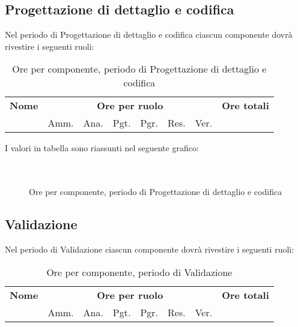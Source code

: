 \pagebreak
\subsection{Progettazione di dettaglio e codifica}

Nel periodo di Progettazione di dettaglio e codifica ciascun componente dovrà rivestire i seguenti ruoli:

\begin{table}[H]
\centering
\begin{tabular}{lccccccc}
\toprule 
    \textbf{Nome}  & \multicolumn{6}{c}{\textbf{Ore per ruolo}} & \textbf{Ore totali}\\
     & Amm. & Ana. & Pgt. & Pgr. & Res. & Ver. \\
    \midrule

    	

    \bottomrule
\end{tabular}
\caption{Ore per componente, periodo di Progettazione di dettaglio e codifica}
\end{table}

I valori in tabella sono riassunti nel seguente grafico: \\ \\ \\

\begin{figure}[H]
\caption{Ore per componente, periodo di Progettazione di dettaglio e codifica}
\end{figure}
\pagebreak
\subsection{Validazione}

Nel periodo di Validazione ciascun componente dovrà rivestire i seguenti ruoli:

\begin{table}[H]
\centering
\begin{tabular}{lccccccc}
\toprule 
    \textbf{Nome}  & \multicolumn{6}{c}{\textbf{Ore per ruolo}} & \textbf{Ore totali}\\
    & Amm. & Ana. & Pgt. & Pgr. & Res. & Ver. \\
    \midrule

        

    \bottomrule
\end{tabular}
\caption{Ore per componente, periodo di Validazione}
\end{table}

